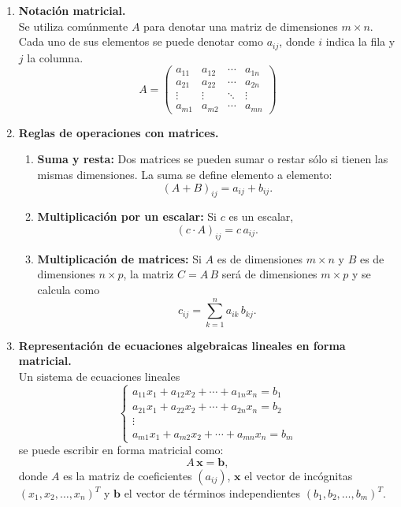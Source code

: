 \documentclass[12pt,letterpaper]{article}
\theoremstyle{definition}
\theoremstyle{plain}
\theoremstyle{remark}
\begin{document}
\begin{enumerate}
    \item \textbf{Notación matricial.}\\
    Se utiliza comúnmente $A$ para denotar una matriz de dimensiones $m \times n$. Cada uno de sus elementos se puede denotar como $a_{ij}$, donde $i$ indica la fila y $j$ la columna.
    \[
       A = \begin{pmatrix}
       a_{11} & a_{12} & \cdots & a_{1n} \\
       a_{21} & a_{22} & \cdots & a_{2n} \\
       \vdots & \vdots & \ddots & \vdots \\
       a_{m1} & a_{m2} & \cdots & a_{mn}
       \end{pmatrix}
    \]

    \item \textbf{Reglas de operaciones con matrices.}
    \begin{enumerate}
        \item \textbf{Suma y resta:} Dos matrices se pueden sumar o restar sólo si tienen las mismas dimensiones. La suma se define elemento a elemento: 
        \[
        (A + B)_{ij} = a_{ij} + b_{ij}.
        \]
        \item \textbf{Multiplicación por un escalar:} Si $c$ es un escalar,
        \[
        (c \cdot A)_{ij} = c \, a_{ij}.
        \]
        \item \textbf{Multiplicación de matrices:} Si $A$ es de dimensiones $m \times n$ y $B$ es de dimensiones $n \times p$, la matriz $C = A\,B$ será de dimensiones $m \times p$ y se calcula como
        \[
        c_{ij} = \sum_{k=1}^{n} a_{ik}\, b_{kj}.
        \]
    \end{enumerate}

    \item \textbf{Representación de ecuaciones algebraicas lineales en forma matricial.}\\
    Un sistema de ecuaciones lineales
    \begin{equation}
    \begin{cases}
    a_{11} x_1 + a_{12} x_2 + \cdots + a_{1n} x_n = b_1 \\
    a_{21} x_1 + a_{22} x_2 + \cdots + a_{2n} x_n = b_2 \\
    \vdots \\
    a_{m1} x_1 + a_{m2} x_2 + \cdots + a_{mn} x_n = b_m
    \end{cases} \label{eq:elimb} \tag{1.1}
    \end{equation}
    se puede escribir en forma matricial como:
    \begin{equation}
    A \,\mathbf{x} = \mathbf{b}, \label{eq:1.2} \tag{1.2}
    \end{equation}
    donde $A$ es la matriz de coeficientes $(a_{ij})$, $\mathbf{x}$ el vector de incógnitas $(x_1, x_2, \dots, x_n)^T$ y $\mathbf{b}$ el vector de términos independientes $(b_1, b_2, \dots, b_m)^T$.
\end{enumerate}
\end{document}
